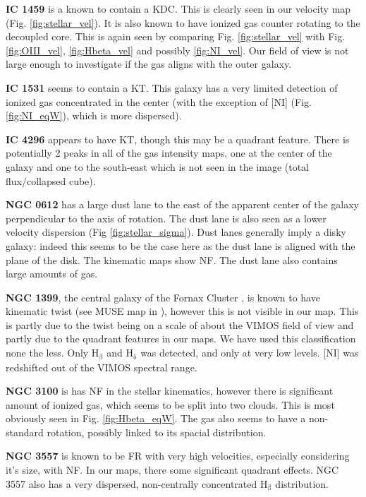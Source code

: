 \documentclass[fleqn,usenatbib,useAMS]{mnras}
\begin{document}
	\textbf{IC 1459} is a known to contain a KDC. This is clearly seen in our velocity map (Fig. \ref{fig:stellar_vel}). It is also known to have ionized gas counter rotating to the decoupled core. This is again seen by comparing Fig. \ref{fig:stellar_vel} with Fig. \ref{fig:OIII_vel}, \ref{fig:Hbeta_vel} and possibly \ref{fig:NI_vel}. Our field of view is not large enough to investigate if the gas aligns with the outer galaxy.

	\textbf{IC 1531} seems to contain a KT. This galaxy has a very limited detection of ionized gas concentrated in the center (with the exception of [NI] (Fig. \ref{fig:NI_eqW}), which is more dispersed).

	\textbf{IC 4296} appears to have KT, though this may be a quadrant feature. There is potentially 2 peaks in all of the gas intensity maps, one at the center of the galaxy and one to the south-east which is not seen in the image (total flux/collapsed cube).

	\textbf{NGC 0612} has a large dust lane to the east of the apparent center of the galaxy perpendicular to the axis of rotation. The dust lane is also seen as a lower velocity dispersion (Fig \ref{fig:stellar_sigma}). Dust lanes generally imply a disky galaxy: indeed this seems to be the case here as the dust lane is aligned with the plane of the disk. The kinematic maps show NF. The dust lane also contains large amounts of gas. 

	\textbf{NGC 1399}, the central galaxy of the Fornax Cluster \citep{Jordan2007}, is known to have kinematic twist (see MUSE map in \citet{Zieleniewski2017}), however this is not visible in our map. This is partly due to the twist being on a scale of about the VIMOS field of view and partly due to the quadrant features in our maps. We have used this classification none the less. Only H$_\mathrm{\beta}$ and H$_\mathrm{\delta}$ was detected, and only at very low levels. [NI] was redshifted out of the VIMOS spectral range.

	\textbf{NGC 3100} is has NF in the stellar kinematics, however there is significant amount of ionized gas, which seems to be split into two clouds. This is most obviously seen in Fig. \ref{fig:Hbeta_eqW}. The gas also seems to have a non-standard rotation, possibly linked to its spacial distribution. 

	\textbf{NGC 3557} is known to be FR with very high velocities, especially considering it's size, with NF. In our maps, there some significant quadrant effects. NGC 3557 also has a very dispersed, non-centrally concentrated H$_\mathrm{\beta}$ distribution. 
\end{document}
